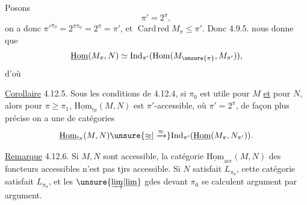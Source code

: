 Posons 
\[
 \pi'=2^\pi,
\]
on a donc ${\pi'}^{\pi_0}=2^{\pi\pi_0}=2^\pi=\pi'$, et 
$\operatorname{Card\,red}M_\pi\leq\pi'$. Donc 4.9.5. nous donne
que
\[
 \underline{\mathrm{Hom}}(M_\pi,N)\simeq\mathrm{Ind}_{\pi'}(\mathrm{Hom}(M_{\unsure{\pi}},M_{\pi'})),
\]
d'où

\uline{Corollaire} 4.12.5. Sous les conditions de
4.12.4, si $\pi_0$ est utile pour $M$ \uline{et}
pour $N$, alors pour $\pi\geq\pi_1$, 
$\underline{\mathrm{Hom}}_{!\pi}(M,N)$ est $\pi'$-accessible, où $\pi'=2^\pi$,
de façon plus précise on a une
 de catégories
\[
 \underline{\mathrm{Hom}}_{!\pi}(M,N)\unsure{\underline{\approx}|\xrightarrow{\approx}}
 \mathrm{Ind}_{\pi'}(\underline{\mathrm{Hom}}(M_\pi,N_{\pi'})).
\]

\uline{Remarque} 4.12.6. Si  $M,N$ sont accessible,
la catégorie $\underline{\mathrm{Hom}}_{\mathrm{acc}}(M,N)$ des foncteurs
accessibles n'est pas  tjrs accessible.
Si $N$ satisfait $L_{\pi_0}$, cette catégorie
satisfait $L_{\pi_0}$, et les $\unsure{\underrightarrow{\lim}|\underline{\lim}}$ gdes devant
$\pi_0$ se calculent argument par argument.

